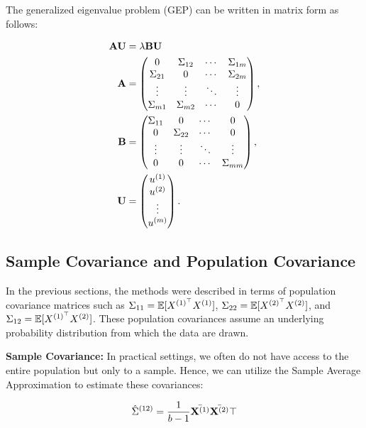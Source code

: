 The generalized eigenvalue problem (GEP) can be written in matrix form as follows:

\begin{align}
    \mathbf{A} \mathbf{U} &= \lambda \mathbf{B} \mathbf{U} \\
    \mathbf{A} &= \begin{pmatrix}
        0 & \Sigma_{12} & \cdots & \Sigma_{1m} \\
        \Sigma_{21} & 0 & \cdots & \Sigma_{2m} \\
        \vdots & \vdots & \ddots & \vdots \\
        \Sigma_{m1} & \Sigma_{m2} & \cdots & 0
    \end{pmatrix}, \\
    \mathbf{B} &= \begin{pmatrix}
        \Sigma_{11} & 0 & \cdots & 0 \\
        0 & \Sigma_{22} & \cdots & 0 \\
        \vdots & \vdots & \ddots & \vdots \\
        0 & 0 & \cdots & \Sigma_{mm}
    \end{pmatrix}, \\
    \mathbf{U} &= \begin{pmatrix}
        u^{(1)} \\
        u^{(2)} \\
        \vdots \\
        u^{(m)}
    \end{pmatrix}.
\end{align}

\subsection{Sample Covariance and Population Covariance}
In the previous sections, the methods were described in terms of population covariance matrices such as \(\Sigma_{11}=\mathbb{E}[X^{(1)^{\top}} X^{(1)}]\), \(\Sigma_{22}=\mathbb{E}[X^{(2)^{\top}} X^{(2)}]\), and \(\Sigma_{12}=\mathbb{E}[X^{(1)^{\top}} X^{(2)}]\). These population covariances assume an underlying probability distribution from which the data are drawn.

\textbf{Sample Covariance:} In practical settings, we often do not have access to the entire population but only to a sample. Hence, we can utilize the Sample Average Approximation to estimate these covariances:

\[
    \hat{\Sigma}^{(12)} = \frac{1}{b-1} \bar{\mathbf{X}^{(1)}} \bar{\mathbf{X}^{(2)}}\top
\]

